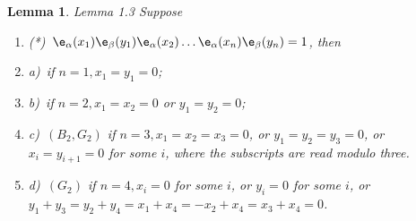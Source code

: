 \documentclass{memo-l}
\newtheorem{lemma}[theorem]{Lemma}
\theoremstyle{definition}
\theoremstyle{remark}
\numberwithin{section}{chapter}
\numberwithin{equation}{chapter}
\begin{document}
\begin{lemma}{Lemma 1.3}   Suppose 
\begin{enumerate}
\item{(*)}\   ${\e}_{\alpha}(x_{1}){\e}_{\beta}(y_{1})
{\e}_{\alpha}(x_{2})\ldots {\e}_{\alpha}(x_{n})
{\e}_{\beta}(y_{n}) = 1$, then
\item{a)}\   if $n = 1, x_{1} = y_{1} = 0$;
\item{b)}\ if  $n = 2, x_{1} = x_{2} = 0$ or $y_{1} = y_{2} = 0$;
\item{c)}\   $(B_{2}, G_{2})$ if $n = 3, x_{1} = x_{2} = x_{3} = 0$, or 
$y_{1} = y_{2} = y_{3} = 0$, 
or $x_{i} = y_{i+1} = 0$ for some $i$, where the subscripts are 
read modulo three.
\item{d)}\  $(G_{2})$ if $n = 4, x_{i} = 0$ for some $i$, or $y_{i} = 0$ 
for some $i$, or  
\newline
$y_{1}+y_{3} = y_{2}+y_{4} = x_{1}+x_{4} = -x_{2}+x_{4} 
= x_{3}+x_{4} = 0$.
\end{enumerate}
\end{lemma}
\end{document}

